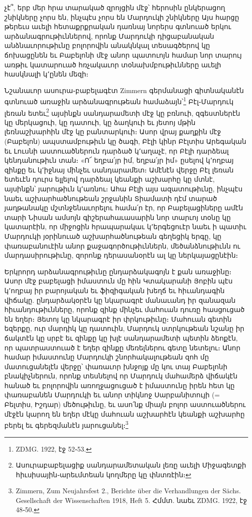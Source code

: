 \documentclass{article}
\begin{document}
{չէ՞, երբ մեր հրա տարակած զրոյցին մէջ՝ հերոսին ընկերացող շնիկները չորս են, ինչպէս չորս են Մարդուկի շնիկները Այս հարցը թերեւս աւելի հետաքրքրական դառնայ նորերս գտնուած երկու արձանագրութիւններով, որոնք Մարդուկի դիցաբանական անձնաւորութիւնը բոլորովին անակնկալ տեսագծերով կը ճոխացընեն եւ Բաբելոնի մէջ անոր պատուոյն համար նոր տարույ առթիւ կատարուած հռչակաւոր տօնախմբութիւնները աւելի հասկնալի կ՚ընեն մեզի։

Նշանաւոր ասուրա֊բաբելագէտ Zimmern գերմանացի գիտնականէն գտնուած առաջին արձանագրութեան համաձայն՝\footnote{ZDMG. 1922, էջ 52֊53.} Բէլ֊Մարդուկ լեռան ետեւ\footnote{Ասուրաբաբելացիք սանդարամետական լեռը աւելի Միջագետքի հիւսիսային֊արեւմտեան կողմերը կը փնտռէին։} այսինքն սանդարամետի մէջ կը բռնուի, զգեստներէն կը մերկացուի, կը դատուի, կը ձաղկուի եւ յետոյ մթին լեռնաշխարհին մէջ կը բանտարկուի։ Ասոր վրայ քաղքին մէջ (Բաբելոն) ապստամբութիւն կը ծագի, Բէլի կինր Բէլտիս Արեգական եւ Լուսնի աստուածներուն դարձած կ՚աղաչէ, որ Բէլի դարձեալ կենդանութիւն տան։ «Ո՜ եղբա՛յր իմ, եղբա՛յր իմ» ըսելով կ՚ողբայ զինքը եւ կ՚իջնայ մինչեւ սանդարամետ։ Ամէնէն վերջը Բէլ լեռան ետեւէն դուրս ելլելով դարձեալ կեանքի աշխարհը կը մտնէ, այսինքն՝ յարութիւն կ՚առնու։ Ահա Բէլի այս ազատութիւնը, ինչպէս նաեւ աշխարհածնութեան շրջանին Տիամատի դէմ տարած յաղթանակը մշտնջենաւորելու համա՛ր էր, որ Բաբելացիները ամէն տարի Նիսան ամսոյն գիշերահաւասարին նոր տարւոյ տօնը կը կատարէին, որ միջոցին հրապարակաւ կ՚երգեցուէր նաեւ ի պատիւ Մարդուկի յօրինուած աշխարհածնութեան գեղեցիկ երգը, կը փառաբանուէին անոր քաջագործութիւններն, մեծանձնութիւնն ու մարդասիրութիւնը, զորոնք դերասանօրէն ալ կը ներկայացընէին։

Երկրորդ արձանագրութիւնը ընդարձակագոյն է քան առաջինը։ Ասոր մէջ բաբելացի իմաստուն մը հին Կտակարանի Յոբին պէս կ՚ողբայ իր բարոյական եւ ֆիզիգական խեղճ եւ հիւանդագին վիճակը. ընդարձակօրէն կը նկարագրէ մանաւանդ իր զանազան հիւանդութիւնները, որոնք զինք մինչեւ մահուան դուռը հասցուցած են եղեր։ Յետոյ կը նկարագրէ իր փրկութիւնը։ Մահուան գետին եզերքը, ուր մարդիկ կը դատուին, Մարդուկ ստրկութեան նշանը իր ճակտէն կը սրբէ եւ զինքը կը խլէ սանդարամետի պետին ձեոքէն, որ պատրաստուած է եղեր զինքը մեռելներու գետը նետելու։ Անոր համար իմաստունը Մարդուկի շնորհակալութեան զոհ մը մատուցանելէն վերջը՝ փառաւոր խնջոյք մը կու տայ Բաբելոնի բնակիչներուն, որոնք տեսնելով որ Մարդուկ մահամերձ վիճակէն հանած եւ բոլորովին առողջացուցած է իմաստունը իրեն հետ կը փառաբանեն Մարդուկի եւ անոր տիկնոջ Սարբանիտույի (= Բելտիս, Իշդար) մեծութիւնը, եւ ասո՛նք միայն բոլոր աստուածներու մէջէն կարող են եղեր մէկը մահուան աշխարհէն կեանքի աշխարհը բերել եւ գերեզմանէն յարուցանել։\footnote{Zimmern, Zum Neujahrsfest 2., Berichte über die Verhandlungen der Sächs. Gesellschaft der Wissenschaften 1918, Heft 5. Հմմտ. նաեւ ZDMG. 1922, էջ 48֊50.}

}
\end{document}
